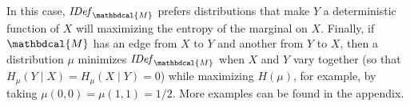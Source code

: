 \documentclass{article}
\theoremstyle{plain}
\theoremstyle{definition}
\theoremstyle{remark}
\newcommand{\dg}[1]{\mathbdcal{#1}}
\newcommand{\IBal}[1]{\mathit{IDef}_{#1}}
\numberwithin{equation}{section}
\begin{document}
In this case, $\IBal{\dg M}$ prefers distributions that make $Y$ a
deterministic function of $X$ will maximizing the entropy of the
marginal on $X$.
Finally, if ${\dg M}$ has an edge from $X$ to $Y$ and another from $Y$
to $X$, then 
a distribution $\mu$ minimizes
$\IBal{\dg M}$ when 
$X$ and $Y$  vary together
(so that $H_\mu(Y \mid X) = H_\mu(X \mid Y) = 0$) while
maximizing $H(\mu)$, for example, by taking $\mu(0,0) = \mu(1,1) = 1/2$.
More examples can be found in
the appendix. 
\end{document}
